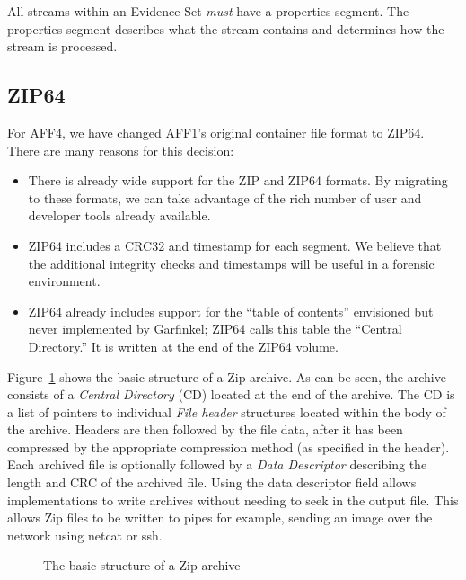 \documentclass[10pt, conference]{IEEEtran}
\begin{document}
All streams within an Evidence Set \emph{must} have a properties segment. The
properties segment describes what the stream contains and determines
how the stream is processed. 


\subsection{ZIP64}
For AFF4, we have changed AFF1's original container file format to
ZIP64\cite{zipspecs}. There are many reasons for this decision:

\begin{itemize}
\item There is already wide support for the ZIP and ZIP64 formats. By
  migrating to these formats, we can take advantage of the rich number
  of user and developer tools already available.
\item ZIP64 includes a CRC32 and timestamp for each segment. We
  believe that the additional integrity checks and timestamps will be
  useful in a forensic environment.
\item ZIP64 already includes support for the ``table of contents''
  envisioned but never implemented by Garfinkel; ZIP64 calls this
  table the ``Central Directory.'' It is written at the end of the
  ZIP64 volume.
\end{itemize}

Figure~\ref{zip_structure} shows the basic structure of a Zip
archive. As can be seen, the archive consists of a {\em Central Directory} (CD)
located at the end of the archive. The CD is a list of pointers to
individual {\em File header} structures located within the body of the
archive. Headers are then followed by the file data, after it has been
compressed by the appropriate compression method (as specified in the
header). Each archived file is optionally followed by a {\em Data
Descriptor} describing the length and CRC of the archived file. Using
the data descriptor field allows implementations to write archives
without needing to seek in the output file. This allows Zip files to
be written to pipes for example, sending an image over the network
using netcat or ssh.

\begin{figure}[tb]
  \begin{center}
  \mbox{\columnwidth {}}
  \caption{The basic structure of a Zip archive}
  \label{zip_structure}
  \end{center}
\end{figure}
\end{document}
